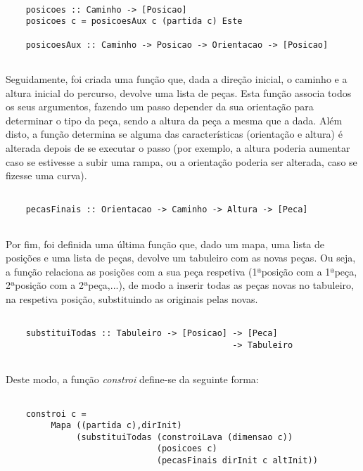 \documentclass[a4paper]{report} %
\begin{document}
  \begin{verbatim}
    
    posicoes :: Caminho -> [Posicao]
    posicoes c = posicoesAux c (partida c) Este
    
    posicoesAux :: Caminho -> Posicao -> Orientacao -> [Posicao]
    
  \end{verbatim}
  
  \newpage

  \par \noindent Seguidamente, foi criada uma função que, dada a direção inicial, o caminho e a altura inicial do percurso, devolve uma lista de peças. Esta função associa todos os seus argumentos, fazendo um passo depender da sua orientação para determinar o tipo da peça, sendo a altura da peça a mesma que a dada. Além disto, a função determina se alguma das características (orientação e altura) é alterada depois de se executar o passo (por exemplo, a altura poderia aumentar caso se estivesse a subir uma rampa, ou a orientação poderia ser alterada, caso se fizesse uma curva).

  \begin{verbatim}
    
    pecasFinais :: Orientacao -> Caminho -> Altura -> [Peca]
    
  \end{verbatim}

  \par \noindent Por fim, foi definida uma última função que, dado um mapa, uma lista de posições e uma lista de peças, devolve um tabuleiro com as novas peças. Ou seja, a função relaciona as posições com a sua peça respetiva (1ªposição com a 1ªpeça, 2ªposição com a 2ªpeça,...), de modo a inserir todas as peças novas no tabuleiro, na respetiva posição, substituindo as originais pelas novas.

  \begin{verbatim}
    
    substituiTodas :: Tabuleiro -> [Posicao] -> [Peca] 
                                             -> Tabuleiro
    
  \end{verbatim}

  \par \noindent Deste modo, a função \textit{constroi} define-se da seguinte forma:

  \begin{verbatim}

    constroi c = 
         Mapa ((partida c),dirInit) 
              (substituiTodas (constroiLava (dimensao c)) 
                              (posicoes c)
                              (pecasFinais dirInit c altInit))

  \end{verbatim}
\end{document}
